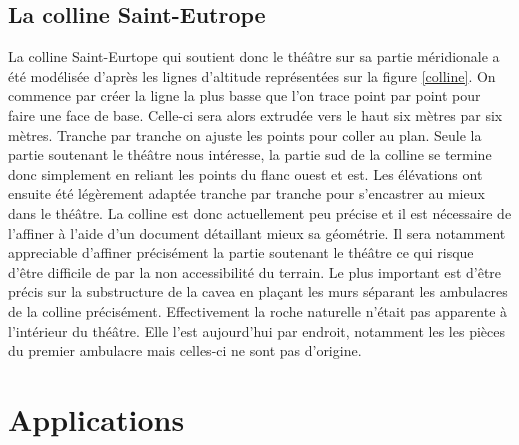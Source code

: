 \section{La colline Saint-Eutrope} 
La colline Saint-Eurtope qui soutient donc le théâtre sur sa partie méridionale a été modélisée d'après les lignes d'altitude représentées sur la figure \ref{colline}. On commence par créer la ligne la plus basse que l'on trace point par point pour faire une face de base. Celle-ci sera alors extrudée vers le haut six mètres par six mètres. Tranche par tranche on ajuste les points pour coller au plan. Seule la partie soutenant le théâtre nous intéresse, la partie sud de la colline se termine donc simplement en reliant les points du flanc ouest et est. Les élévations ont ensuite été légèrement adaptée tranche par tranche pour s'encastrer au mieux dans le théâtre. La colline est donc actuellement peu précise et il est nécessaire de l'affiner à l'aide d'un document détaillant mieux sa géométrie. Il sera notamment appreciable d'affiner précisément la partie soutenant le théâtre ce qui risque d'être difficile de par la non accessibilité du terrain. Le plus important est d'être précis sur la substructure de la cavea en plaçant les murs séparant les ambulacres de la colline précisément. Effectivement la roche naturelle n'était pas apparente à l'intérieur du théâtre. Elle l'est aujourd'hui par endroit, notamment les les pièces du premier ambulacre mais celles-ci ne sont pas d'origine.

		
\chapter{Applications}
	\minitoc
	\newpage
		

